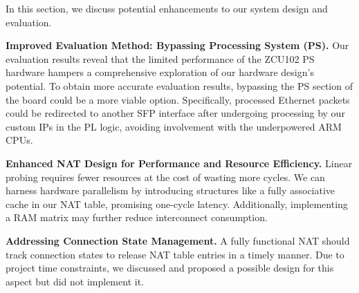 In this section, we discuss potential enhancements to our system design and evaluation.

\textbf{Improved Evaluation Method: Bypassing Processing System (PS).} Our evaluation results reveal that the limited performance of the ZCU102 PS hardware hampers a comprehensive exploration of our hardware design's potential. To obtain more accurate evaluation results, bypassing the PS section of the board could be a more viable option. Specifically, processed Ethernet packets could be redirected to another SFP interface after undergoing processing by our custom IPs in the PL logic, avoiding involvement with the underpowered ARM CPUs.

\textbf{Enhanced NAT Design for Performance and Resource Efficiency.} Linear probing requires fewer resources at the cost of wasting more cycles. We can harness hardware parallelism by introducing structures like a fully associative cache in our NAT table, promising one-cycle latency. Additionally, implementing a RAM matrix may further reduce interconnect consumption.

\textbf{Addressing Connection State Management.} A fully functional NAT should track connection states to release NAT table entries in a timely manner. Due to project time constraints, we discussed and proposed a possible design for this aspect but did not implement it.
